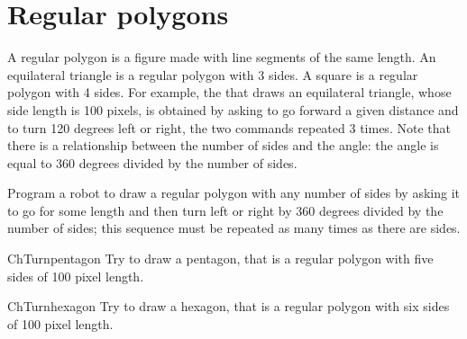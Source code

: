 


\section{Regular polygons} \label{sec:firstPolygons} 
A regular polygon is a figure made with line segments of the same
length. An equilateral triangle is a regular polygon with 3 sides. A
square is a regular polygon with 4 sides.  For example, the
 that draws an equilateral triangle,
whose side length is 100 pixels, is obtained by asking \caro to go
forward a given distance and to turn 120 degrees left or right, the two
commands repeated 3 times. Note that there is a relationship between the 
number of sides and the angle: the angle is equal to 360 degrees divided 
by the number of sides. 

Program a robot to draw a regular polygon with any number of
sides by asking it to go for some length and then turn left or right
by 360 degrees divided by the number of sides; this sequence must be
repeated as many times as there are sides.




\begin{exofig}{ChTurnpentagon} \label{exo:pentagon}
Try to draw a pentagon, that is a regular polygon with five sides
of 100 pixel length.
\end{exofig}


\begin{exofig}{ChTurnhexagon} \label{exo:hexagon}
Try to draw a hexagon, that is a regular polygon with six sides of
100 pixel length.
\end{exofig}


